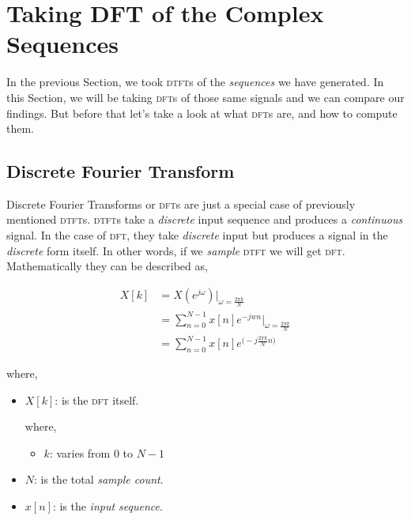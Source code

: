 \documentclass[../../course]{subfiles}
\begin{document}
\def\freqXOne{28}
\def\freqXTwo{56}
\def\freqXThree{56.1}

\def\sampFreqMuchLess{\textbf{(a):} $f_{s} = \frac{4 \times 28}{2} = 56 \si{Hz}$}
\def\sampFreqNorm{\textbf{(b):} $f_{s} = 4 \times 28 = 112 \si{Hz}$}
\def\sampFreqSligGreat{\textbf{(c):} $f_{s} = (4 \times 28) + 10 = 122 \si{Hz}$}
\def\sampFreqMuchGreat{\textbf{(d):} $f_{s} = 4 \times 28 \times 6 = 672 \si{Hz}$}

\section{Taking DFT of the Complex Sequences} \label{sec:wrkTakingDFTCplxSeqs}

In the previous Section, we took \textsc{dtft}s of the \emph{sequences} we have
generated. In this Section, we will be taking \textsc{dft}s of those same signals
and we can compare our findings. But before that let's take a look at what \textsc{dft}s
are, and how to compute them.

\subsection{Discrete Fourier Transform}

Discrete Fourier Transforms or \textsc{dft}s are just a special case of previously
mentioned \textsc{dtft}s. \textsc{dtft}s take a \emph{discrete} input sequence and
produces a \emph{continuous} signal. In the case of \textsc{dft}, they take \emph{discrete}
input but produces a signal in the \emph{discrete} form itself. In other words,
if we \emph{sample} \textsc{dtft} we will get \textsc{dft}. Mathematically they can
be described as,

\begin{align}
    X[k] &= X(e^{j\omega}) |_{\omega = \frac{2 \pi k}{N}} \\
    &= \sum_{n = 0}^{N - 1} x[n] e^{-j w n} \bigg|_{\omega = \frac{2 \pi k}{N}} \\
    &= \sum_{n = 0}^{N - 1} x[n] e^{\big(-j \frac{2 \pi k}{N} n \big)} \label{eqn:dftK}
\end{align}

where,

\begin{itemize} [label=]
    \item $X[k]$: is the \textsc{dft} itself.

        where,

        \begin{itemize} [label=]
            \item $k$: varies from $0$ to $N - 1$
        \end{itemize}

    \item $N$: is the total \emph{sample count}.
    \item $x[n]$: is the \emph{input sequence}.

\end{itemize}
\end{document}
